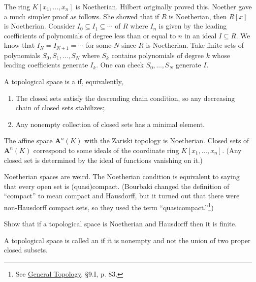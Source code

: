\documentclass[11pt, oneside,margin=1in]{article}
\begin{document}
\begin{example}[ ]\label{}\text{}
The ring $K[x_1,\hdots, x_n]$ is Noetherian. Hilbert originally proved this. Noether gave a much simpler proof as follows. She showed that if $R$ is Noetherian, then $R[x]$ is Noetherian. Consider $I_0\subseteq I_1\subseteq\cdots$ of $R$ where $I_n$ is given by the leading coefficients of polynomials of degree less than or equal to $n$ in an ideal $I\subseteq R$. We know that $I_N=I_{N+1}=\cdots$ for some $N$ since $R$ is Noetherian. Take finite sets of polynomials $S_0,S_1,\hdots, S_N$ where $S_k$ contains polynomials of degree $k$ whose leading coefficients generate $I_k$. One can check $S_0,\hdots, S_N$ generate $I$. 
\end{example}

\begin{definition}[ ]\label{}\text{}
A topological space is a  if, equivalently,
\begin{enumerate}
	\item The closed sets satisfy the descending chain condition, so any decreasing chain of closed sets stabilizes;
	\item Any nonempty collection of closed sets has a minimal element.
\end{enumerate}
\end{definition}
 \begin{remark}
 	The affine space $\mathbf{A}^n(K)$ with the Zariski topology is Noetherian. Closed sets of $\mathbf{A}^n(K)$ correspond to some ideals of the coordinate ring $K[x_1,\hdots, x_n]$. (Any closed set is determined by the ideal of functions vanishing on it.)
 \end{remark}

Noetherian spaces are weird. The Noetherian condition is equivalent to saying that every open set is (quasi)compact. (Bourbaki changed the definition of ``compact'' to mean compact and Hausdorff, but it turned out that there were non-Hausdorff compact sets, so they used the term ``quasicompact.''\footnote{See \underline{General Topology}, \S 9.I, p. 83.}) 

\begin{exercise}\label{}\text{}
Show that if a topological space is Noetherian and Hausdorff then it is finite.
\end{exercise}

\begin{definition}[ ]\label{}\text{}
A topological space is called an  if it is nonempty and not the union of two proper closed subsets.
\end{definition}
\end{document}
